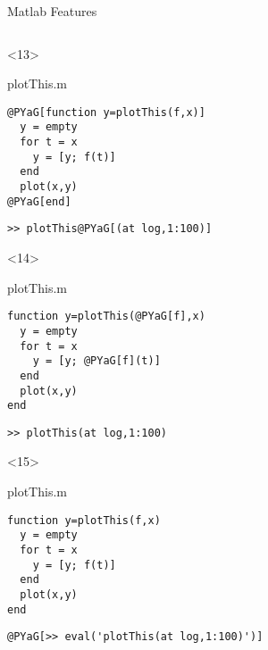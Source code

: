 \begin{frame}[fragile]{Matlab Features}
\begin{columns}
\begin{column}[T]{5cm}
      \begin{onlyenv}<13>
        \begin{block}{plotThis.m}
          \begin{Verbatim}[commandchars=@\[\]]
@PYaG[function y=plotThis(f,x)]
  y = empty
  for t = x
    y = [y; f(t)]
  end
  plot(x,y)
@PYaG[end]
          \end{Verbatim}
        \end{block}
          \begin{Verbatim}[commandchars=@\[\]]
>> plotThis@PYaG[(at log,1:100)]
        \end{Verbatim}
      \end{onlyenv}
      \begin{onlyenv}<14>
        \begin{block}{plotThis.m}
          \begin{Verbatim}[commandchars=@\[\]]
function y=plotThis(@PYaG[f],x)
  y = empty
  for t = x
    y = [y; @PYaG[f](t)]
  end
  plot(x,y)
end
          \end{Verbatim}
        \end{block}
          \begin{Verbatim}[commandchars=@\[\]]
>> plotThis(at log,1:100)
        \end{Verbatim}
      \end{onlyenv}


      \begin{onlyenv}<15>
        \begin{block}{plotThis.m}
          \begin{Verbatim}[commandchars=@\[\]]
function y=plotThis(f,x)
  y = empty
  for t = x
    y = [y; f(t)]
  end
  plot(x,y)
end
          \end{Verbatim}
        \end{block}
          \begin{Verbatim}[commandchars=@\[\]]
@PYaG[>> eval('plotThis(at log,1:100)')]
        \end{Verbatim}
      \end{onlyenv}

    \end{column}




\end{columns}
\end{frame}
